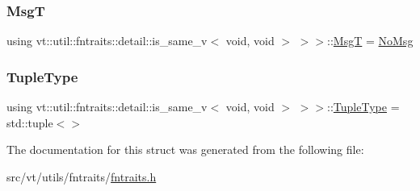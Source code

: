 \subsubsection{\texorpdfstring{MsgT}{MsgT}}
{\footnotesize\ttfamily using vt\+::util\+::fntraits\+::detail\+::is\+\_\+same\+\_\+v$<$ void, void $>$ $>$$>$\+::\hyperlink{structvt_1_1util_1_1fntraits_1_1detail_1_1_c_b_traits_impl_3_01std_1_1enable__if__t_3_01std_1_1i933df4c983821ba8d7030f4c9e1d83e1_a41e5b847c7b6656d27ca265f186ed2aa}{MsgT} =  \hyperlink{structvt_1_1util_1_1fntraits_1_1detail_1_1_no_msg}{No\+Msg}}

\mbox{\label{structvt_1_1util_1_1fntraits_1_1detail_1_1_c_b_traits_impl_3_01std_1_1enable__if__t_3_01std_1_1i933df4c983821ba8d7030f4c9e1d83e1_a4ed7e0b0d5e02f19c1f76597421a53d4}} 
\subsubsection{\texorpdfstring{Tuple\+Type}{TupleType}}
{\footnotesize\ttfamily using vt\+::util\+::fntraits\+::detail\+::is\+\_\+same\+\_\+v$<$ void, void $>$ $>$$>$\+::\hyperlink{structvt_1_1util_1_1fntraits_1_1detail_1_1_c_b_traits_impl_3_01std_1_1enable__if__t_3_01std_1_1i933df4c983821ba8d7030f4c9e1d83e1_a4ed7e0b0d5e02f19c1f76597421a53d4}{Tuple\+Type} =  std\+::tuple$<$$>$}



The documentation for this struct was generated from the following file\+:\begin{DoxyCompactItemize}
\item 
src/vt/utils/fntraits/\hyperlink{fntraits_8h}{fntraits.\+h}\end{DoxyCompactItemize}
